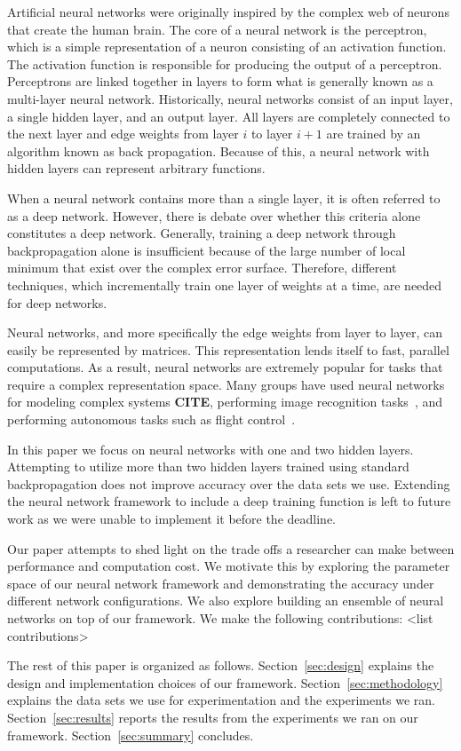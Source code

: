 Artificial neural networks were originally inspired by the complex web of neurons that create the human brain.
The core of a neural network is the perceptron, which is a simple representation of a neuron consisting of an activation function.
The activation function is responsible for producing the output of a perceptron.
Perceptrons are linked together in layers to form what is generally known as a multi-layer neural network.
Historically, neural networks consist of an input layer, a single hidden layer, and an output layer.
All layers are completely connected to the next layer and edge weights from layer \(i\) to layer \(i+1\) are trained by an algorithm known as back propagation.
Because of this, a neural network with hidden layers can represent arbitrary functions.

When a neural network contains more than a single layer, it is often referred to as a deep network.
However, there is debate over whether this criteria alone constitutes a deep network.
Generally, training a deep network through backpropagation alone is insufficient because of the large number of local minimum that exist over the complex error surface.
Therefore, different techniques, which incrementally train one layer of weights at a time, are needed for deep networks.

Neural networks, and more specifically the edge weights from layer to layer, can easily be represented by matrices.
This representation lends itself to fast, parallel computations.
As a result, neural networks are extremely popular for tasks that require a complex representation space.
Many groups have used neural networks for modeling complex systems {\bf CITE}, performing image recognition tasks~\cite{alvira2001}, and performing autonomous tasks such as flight control~\cite{kim1997nonlinear}.

In this paper we focus on neural networks with one and two hidden layers.
Attempting to utilize more than two hidden layers trained using standard backpropagation does not improve accuracy over the data sets we use.
Extending the neural network framework to include a deep training function is left to future work as we were unable to implement it before the deadline.

Our paper attempts to shed light on the trade offs a researcher can make between performance and computation cost.
We motivate this by exploring the parameter space of our neural network framework and demonstrating the accuracy under different network configurations.
We also explore building an ensemble of neural networks on top of our framework.
We make the following contributions: <list contributions>

The rest of this paper is organized as follows.
Section~\ref{sec:design} explains the design and implementation choices of our framework.
Section~\ref{sec:methodology} explains the data sets we use for experimentation and the experiments we ran.
Section~\ref{sec:results} reports the results from the experiments we ran on our framework.
Section~\ref{sec:summary} concludes.
